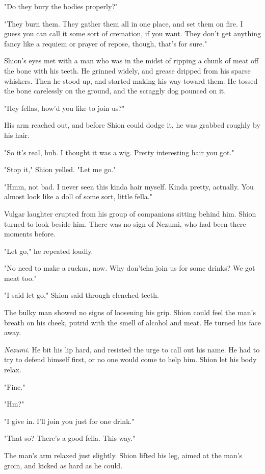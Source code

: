 "Do they bury the bodies properly?"

"They burn them. They gather them all in one place, and set them on
fire. I guess you can call it some sort of cremation, if you want. They
don't get anything fancy like a requiem or prayer of repose, though,
that's for sure."

Shion's eyes met with a man who was in the midst of ripping a chunk of
meat off the bone with his teeth. He grinned widely, and grease dripped
from his sparse whiskers. Then he stood up, and started making his way
toward them. He tossed the bone carelessly on the ground, and the
scraggly dog pounced on it.

"Hey fellas, how'd you like to join us?"

His arm reached out, and before Shion could dodge it, he was grabbed
roughly by his hair.

"So it's real, huh. I thought it was a wig. Pretty interesting hair you
got."

"Stop it," Shion yelled. "Let me go."

"Hmm, not bad. I never seen this kinda hair myself. Kinda pretty,
actually. You almost look like a doll of some sort, little fella."

Vulgar laughter erupted from his group of companions sitting behind him.
Shion turned to look beside him. There was no sign of Nezumi, who had
been there moments before.

"Let go," he repeated loudly.

"No need to make a ruckus, now. Why don'tcha join us for some drinks? We
got meat too."

"I said let go," Shion said through clenched teeth.

The bulky man showed no signs of loosening his grip. Shion could feel
the man's breath on his cheek, putrid with the smell of alcohol and
meat. He turned his face away.

\emph{Nezumi}. He bit his lip hard, and resisted the urge to call out his name.
He had to try to defend himself first, or no one would come to help him.
Shion let his body relax.

"Fine."

"Hm?"

"I give in. I'll join you just for one drink."

"That so? There's a good fella. This way."

The man's arm relaxed just slightly. Shion lifted his leg, aimed at the
man's groin, and kicked as hard as he could.

